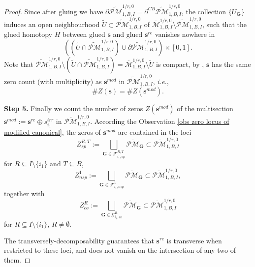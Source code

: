 \documentclass[11pt]{amsart}
\theoremstyle{definition}
\theoremstyle{remark}
\newcommand{\oPMb}{{\overline{\mathcal{PM}}}}
\newcommand{\nontilde}{}
\newcommand{\<}{\left<}
\renewcommand{\>}{\right>}
\numberwithin{equation}{section}
\def\Mbar{{\overline{\mathcal M}}}
\begin{document}
\begin{proof}
     Since after gluing we have $\partial \widetilde{\mathcal{PM}}^{1/r,0}_{1,B,I}=\partial^{CB}\widetilde{\mathcal{PM}}^{1/r,0}_{1,B,I}$, the collection $\{U_{\bm{G}}\}$ induces an open neighbourhood $\widetilde{U}\subset \widetilde{\mathcal{PM}}^{1/r,0}_{1,B,I}$ of $\Mbar^{1/r,0}_{1,B,I}\setminus \widetilde{\mathcal{PM}}^{1/r,0}_{1,B,I}$, such that the glued homotopy $H$ between glued $\bm{s}$ and glued $\bm{s}^{re}$ vanishes nowhere in $$\left(\left(\widetilde{U}\cap \widetilde{\mathcal{PM}}^{1/r,0}_{1,B,I}\right)\cup \partial \widetilde{\mathcal{PM}}^{1/r,0}_{1,B,I}\right)\times [0,1].$$
     Note that $\widetilde{\mathcal{PM}}^{1/r,0}_{1,B,I}\setminus \left(\widetilde{U}\cap \widetilde{\mathcal{PM}}^{1/r,0}_{1,B,I}\right)= \Mbar^{1/r,0}_{1,B,I}\setminus \widetilde{U}$ is compact, by \cite[Lemma 4.12]{BCT2}, $\bm{s}$ has the same zero count (with multiplicity) as $\bm{s}^{mod}$ in $\widetilde{\mathcal{PM}}^{1/r,0}_{1,B,I}$, \textit{i.e.},
     \begin{equation}\label{eq zero count coincide}
     \# Z(\bm{s})  = \# Z(\bm{s}^{mod}).     
     \end{equation}

        

    \noindent\textbf{Step 5.} 
        Finally we count the number of zeros $Z(\bm{s}^{mod})$ of the multisection $\bm{s}^{mod}:=\bm{s}^{re} \oplus \nontilde{s}^{trr}_{i_1}$ in $\oPMb^{1/r,0}_{1,B,I}$. According the Observation \ref{obs zero locus of modified canonical}, the zeros of $\bm{s}^{mod}$ are contained in the loci 
         $$
         Z_{sp}^{R,T}:=\bigsqcup_{\bm{G}\in \mathcal F^{R,T}_{i_1,sp}}\oPMb_{\bm{G}}\subset \oPMb_{1,B,I}^{1/r,0}
         $$
         for $R\subseteq I\setminus\{i_1\}$ and $T\subseteq B$,
          $$
         Z_{nsp}^{1}:=\bigsqcup_{\bm{G}\in \mathcal F^{1}_{i_1,nsp}}\oPMb_{\bm{G}}\subset \oPMb_{1,B,I}^{1/r,0},
         $$
         together with
         $$
         Z_{co}^{R}:=\bigsqcup_{\bm{G}\in \mathcal G^{R}_{i_1,co}}\oPMb_{\bm{G}}\subset \oPMb_{1,B,I}^{1/r,0}
         $$
        for $R\subseteq I\setminus\{i_1\}$, $R\ne \emptyset$.
         
         The transversely-decomposability guarantees that $\bm{s}^{re}$ is transverse when restricted to these loci, and does not vanish on the intersection of any two of them. 


\end{proof}
\end{document}

